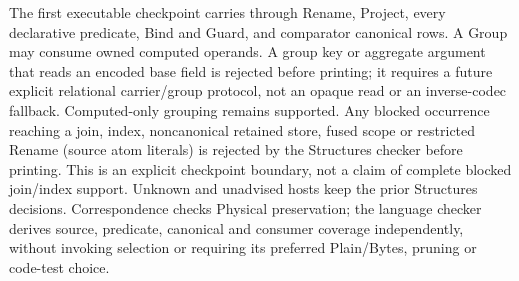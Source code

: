 The first executable checkpoint carries  through Rename,
Project, every declarative predicate, Bind and Guard, and comparator canonical
rows. A Group may consume owned computed operands. A group key or aggregate
argument that reads an encoded base field is rejected before printing; it
requires a future explicit relational carrier/group protocol, not an opaque
read or an inverse-codec fallback. Computed-only grouping remains supported.
Any blocked occurrence reaching a join, index, noncanonical
retained store, fused scope or restricted Rename (source atom literals) is
rejected by the Structures checker before printing.
This is an explicit checkpoint boundary, not a
claim of complete blocked join/index support. Unknown and unadvised hosts keep
the prior Structures decisions. Correspondence checks Physical preservation;
the language checker derives source, predicate, canonical and consumer
coverage independently, without invoking selection or requiring its preferred
Plain/Bytes, pruning or code-test choice.
